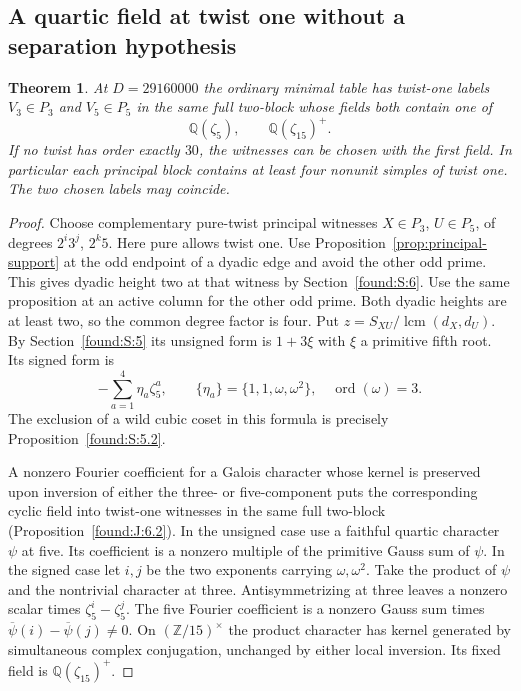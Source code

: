 \documentclass[11pt,a4paper]{article}
\numberwithin{equation}{section}
\newtheorem{theorem}{Theorem}[section]
\theoremstyle{remark}
\newcommand{\ZZ}{\mathbb Z}
\newcommand{\QQ}{\mathbb Q}
\newcommand{\lcm}{\operatorname{lcm}}
\DeclareMathOperator{\ord}{ord}
\begin{document}
\subsection{A quartic field at twist one without a separation hypothesis}\label{found:F:2}
\begin{theorem}\label{found:F:2.1}\label{found:F:key:thm:fields}
At $D=29160000$ the ordinary minimal table has twist-one labels
$V_3\in P_3$ and $V_5\in P_5$ in the same full two-block whose
fields both contain one of
\[
                  \QQ(\zeta_5),\qquad \QQ(\zeta_{15})^+ .
\]
If no twist has order exactly $30$, the witnesses can be chosen with
the first field. In particular each principal block contains at least
four nonunit simples of twist one. The two chosen labels may coincide.
\end{theorem}
\begin{proof}
Choose complementary pure-twist principal witnesses $X\in P_3$,
$U\in P_5$, of degrees $2^i3^j$, $2^k5$. Here pure allows twist one.
Use Proposition~\ref{prop:principal-support} at the odd endpoint of a dyadic edge and
avoid the other odd prime. This gives dyadic height two at that
witness by Section~\ref{found:S:6}. Use the same proposition at an active
column for the other odd prime. Both dyadic heights are at least two,
so the common degree factor is four. Put
$z=S_{XU}/\lcm(d_X,d_U)$. By Section~\ref{found:S:5} its unsigned form is
$1+3\xi$ with $\xi$ a primitive fifth root. Its signed form is
\[
           -\sum_{a=1}^4\eta_a\zeta_5^a,\qquad
           \{\eta_a\}=\{1,1,\omega,\omega^2\},\quad \ord(\omega)=3.
\]
The exclusion of a wild cubic coset in this formula is precisely
Proposition~\ref{found:S:5.2}.

A nonzero Fourier coefficient for a Galois character whose kernel
is preserved upon inversion of either the three- or five-component
puts the corresponding cyclic field into twist-one witnesses in the
same full two-block (Proposition~\ref{found:J:6.2}). In the unsigned case use a
faithful quartic character $\psi$ at five. Its coefficient is a nonzero
multiple of the primitive Gauss sum of $\psi$. In the signed case let
$i,j$ be the two exponents carrying $\omega,\omega^2$. Take the
product of $\psi$ and the nontrivial character at three.
Antisymmetrizing at three leaves a nonzero scalar times
$\zeta_5^i-\zeta_5^j$. The five Fourier coefficient is a nonzero
Gauss sum times $\overline\psi(i)-\overline\psi(j)\ne0$.
On $(\ZZ/15)^\times$ the product character has kernel generated by
simultaneous complex conjugation, unchanged by either local inversion.
Its fixed field is $\QQ(\zeta_{15})^+$.


\end{proof}
\end{document}
